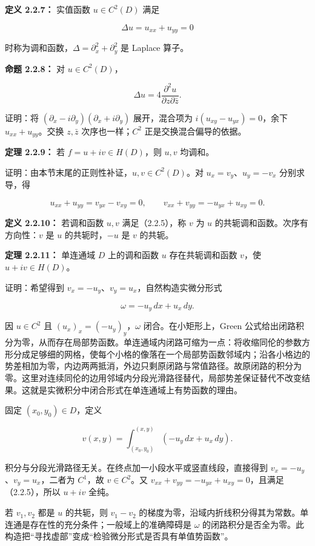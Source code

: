 \documentclass[11pt,a4paper]{article}
\begin{document}
\textbf{定义 2.2.7：} 实值函数 \(u\in C^2(D)\) 满足

\[
\Delta u=u_{xx}+u_{yy}=0
\]

时称为调和函数，\(\Delta=\partial_x^2+\partial_y^2\) 是 Laplace 算子。

\textbf{命题 2.2.8：} 对 \(u\in C^2(D)\)，

\[
\Delta u=4\frac{\partial^2u}{\partial z\partial\bar z}.
\]

证明：将 \((\partial_x-i\partial_y)(\partial_x+i\partial_y)\)
展开，混合项为 \(i(u_{xy}-u_{yx})=0\)，余下 \(u_{xx}+u_{yy}\)。交换
\(z,\bar z\) 次序也一样；\(C^2\) 正是交换混合偏导的依据。

\textbf{定理 2.2.9：} 若 \(f=u+iv\in H(D)\)，则 \(u,v\) 均调和。

证明：由本节末尾的正则性补证，\(u,v\in C^2(D)\)。对
\(u_x=v_y\)、\(u_y=-v_x\) 分别求导，得

\[
u_{xx}+u_{yy}=v_{yx}-v_{xy}=0,\qquad
v_{xx}+v_{yy}=-u_{yx}+u_{xy}=0.
\]

\textbf{定义 2.2.10：} 若调和函数 \(u,v\) 满足（2.2.5），称 \(v\) 为
\(u\) 的共轭调和函数。次序有方向性：\(v\) 是 \(u\) 的共轭时，\(-u\) 是
\(v\) 的共轭。

\textbf{定理 2.2.11：} 单连通域 \(D\) 上的调和函数 \(u\)
存在共轭调和函数 \(v\)，使 \(u+iv\in H(D)\)。

证明：希望得到 \(v_x=-u_y\)、\(v_y=u_x\)，自然构造实微分形式

\[
\omega=-u_y\,dx+u_x\,dy.
\]

因 \(u\in C^2\) 且 \((u_x)_x=(-u_y)_y\)，\(\omega\)
闭合。在小矩形上，Green
公式给出闭路积分为零，从而存在局部势函数。单连通域内闭路可缩为一点：将收缩同伦的参数方形分成足够细的网格，使每个小格的像落在一个局部势函数邻域内；沿各小格边的势差相加为零，内边两两抵消，外边只剩原闭路与常值路径。故原闭路的积分为零。这里对连续同伦的边用邻域内分段光滑路径替代，局部势差保证替代不改变结果。这就是实微积分中闭合形式在单连通域上有势函数的理由。

固定 \((x_0,y_0)\in D\)，定义

\[
v(x,y)=\int_{(x_0,y_0)}^{(x,y)}(-u_y\,dx+u_x\,dy).
\]

积分与分段光滑路径无关。在终点加一小段水平或竖直线段，直接得到
\(v_x=-u_y\)、\(v_y=u_x\)，二者为 \(C^1\)，故 \(v\in C^2\)。又
\(v_{xx}+v_{yy}=-u_{yx}+u_{xy}=0\)，且满足（2.2.5），所以 \(u+iv\)
全纯。

若 \(v_1,v_2\) 都是 \(u\) 的共轭，则 \(v_1-v_2\)
的梯度为零，沿域内折线积分得其为常数。单连通是存在性的充分条件；一般域上的准确障碍是
\(\omega\)
的闭路积分是否全为零。此构造把``寻找虚部''变成``检验微分形式是否具有单值势函数''。
\end{document}
